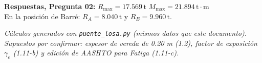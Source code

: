\documentclass[11pt,a4paper]{article}
\newcommand{\uT}{\,\mathrm{t}}
\newcommand{\uTm}{\,\mathrm{t{\cdot}m}}
\begin{document}
\begin{resultado}
\textbf{Respuestas, Pregunta 02:} \quad $R_{\max} = 17.569\uT$ \qquad $M_{\max} = 21.894\uTm$\\[2pt]
{\small En la posición de Barré: $R_A = 8.040\uT$ y $R_B = 9.960\uT$.}
\end{resultado}

\vspace{4pt}
{\small\textit{Cálculos generados con \texttt{puente\_losa.py} (mismos datos que este documento). Supuestos por
confirmar: espesor de vereda de 0.20 m (1.2), factor de exposición $\gamma_e$ (1.11-b) y edición
de AASHTO para Fatiga (1.11-c).}}
\end{document}
